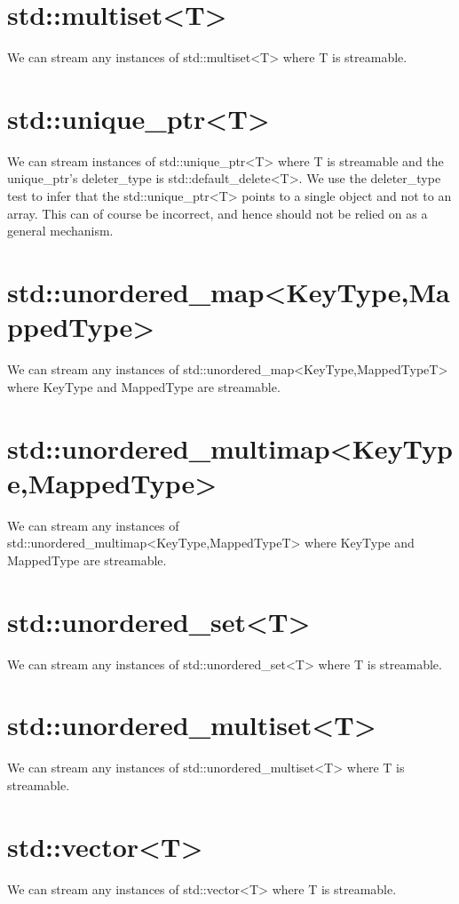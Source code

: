 \section{\ttfamily std::multiset<T>}
We can stream any instances of {\ttfamily std::multiset<T>} where
{\ttfamily T} is streamable.

\section{\ttfamily std::unique\_ptr<T>}
We can stream instances of {\ttfamily std::unique\_ptr<T>} where
{\ttfamily T} is streamable and the {\ttfamily unique\_ptr}'s
{\ttfamily deleter\_type} is {\ttfamily std::default\_delete<T>}.
We use the {\ttfamily deleter\_type} test to infer that the
{\ttfamily std::unique\_ptr<T>} points to a single object and not
to an array.  This can of course be incorrect, and hence should
not be relied on as a general mechanism.

\section{\ttfamily std::unordered\_map<KeyType,MappedType>}
We can stream any instances of
{\ttfamily std::unordered\_map<KeyType,MappedTypeT>} where
{\ttfamily KeyType} and {\ttfamily MappedType} are streamable.

\section{\ttfamily std::unordered\_multimap<KeyType,MappedType>}
We can stream any instances of
{\ttfamily std::unordered\_multimap<KeyType,MappedTypeT>} where
{\ttfamily KeyType} and {\ttfamily MappedType} are streamable.

\section{\ttfamily std::unordered\_set<T>}
We can stream any instances of {\ttfamily std::unordered\_set<T>} where
{\ttfamily T} is streamable.

\section{\ttfamily std::unordered\_multiset<T>}
We can stream any instances of {\ttfamily std::unordered\_multiset<T>} where
{\ttfamily T} is streamable.

\section{\ttfamily std::vector<T>}
We can stream any instances of {\ttfamily std::vector<T>} where
{\ttfamily T} is streamable.


